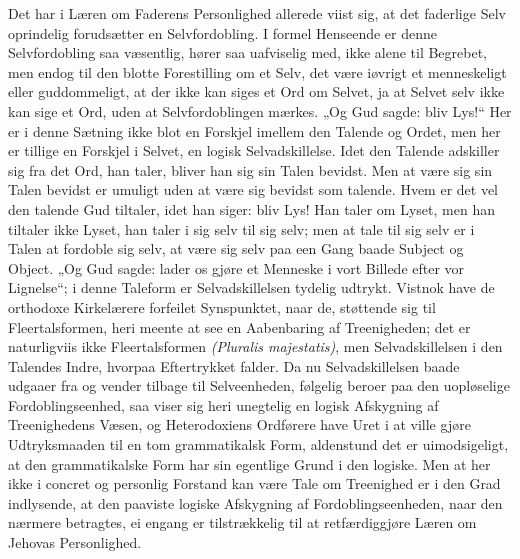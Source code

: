 \documentclass[12pt]{book}
\begin{document}
Det har i Læren om Faderens Personlighed allerede viist sig, at det
faderlige Selv oprindelig forudsætter en Selvfordobling. I formel
Henseende er denne Selvfordobling saa væsentlig, hører saa
uafviselig med, ikke alene til Begrebet, men endog til den blotte
Forestilling om et Selv, det være iøvrigt et menneskeligt eller
guddommeligt, at der ikke kan siges et Ord om Selvet, ja at Selvet
selv ikke kan sige et Ord, uden at Selvfordoblingen mærkes. „Og Gud
sagde: bliv Lys!“ Her er i denne
Sætning ikke blot en Forskjel imellem den Talende og Ordet, men her
er tillige en Forskjel i Selvet, en logisk Selvadskillelse. Idet den
Talende adskiller sig fra det Ord, han taler, bliver han sig sin
Talen bevidst. Men at være sig sin Talen bevidst er umuligt uden at
være sig bevidst som talende. Hvem er det vel den talende Gud
tiltaler, idet han siger: bliv Lys! Han taler om Lyset, men han
tiltaler ikke Lyset, han taler i sig selv til sig selv; men at tale
til sig selv er i Talen at fordoble sig selv, at være sig selv paa
een Gang baade Subject og Object. „Og Gud sagde: lader os gjøre et
Menneske i vort Billede efter vor Lignelse“; i denne Taleform er
Selvadskillelsen tydelig udtrykt. Vistnok have de orthodoxe
Kirkelærere forfeilet Synspunktet, naar de, støttende sig til
Fleertalsformen, heri meente at see en Aabenbaring af Treenigheden;
det er naturligviis ikke Fleertalsformen \textit{(Pluralis
majestatis)}, men Selvadskillelsen i den Talendes Indre, hvorpaa
Eftertrykket falder. Da nu Selvadskillelsen baade udgaaer fra og
vender tilbage til Selveenheden, følgelig beroer paa den uopløselige
Fordoblingseenhed, saa viser sig heri unegtelig en logisk Afskygning
af Treenighedens Væsen, og Heterodoxiens Ordførere have Uret i at
ville gjøre Udtryksmaaden til en tom grammatikalsk Form, aldenstund
det er uimodsigeligt, at den grammatikalske Form har sin egentlige
Grund i den logiske. Men at her ikke i concret og personlig Forstand
kan være Tale om Treenighed er i den Grad indlysende, at den
paaviste logiske Afskygning af Fordoblingseenheden, naar den
nærmere betragtes, ei engang er tilstrækkelig til at
retfærdiggjøre Læren om Jehovas Personlighed.
\end{document}
